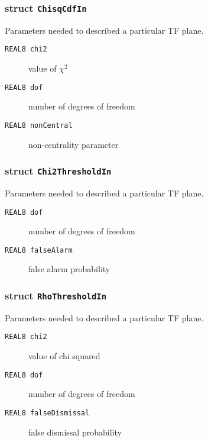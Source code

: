 \subsubsection*{struct \texttt{ChisqCdfIn}}

\noindent Parameters needed to described a particular TF plane.

\begin{description}
\item[\texttt{REAL8     chi2}] value of $\chi^2$
\item[\texttt{REAL8     dof}]  number of degrees of freedom
\item[\texttt{REAL8     nonCentral}]  non-centrality parameter
\end{description}

\subsubsection*{struct \texttt{Chi2ThresholdIn}}

\noindent Parameters needed to described a particular TF plane.

\begin{description}
\item[\texttt{REAL8     dof}]   number of degrees of freedom 
\item[\texttt{REAL8     falseAlarm}]  false alarm probability 
\end{description}

\subsubsection*{struct \texttt{RhoThresholdIn}}

\noindent Parameters needed to described a particular TF plane.

\begin{description}
\item[\texttt{REAL8     chi2}]   value of chi squared  
\item[\texttt{REAL8     dof}]  number of degrees of freedom
\item[\texttt{REAL8     falseDismissal}] false dismissal probability 
\end{description}

